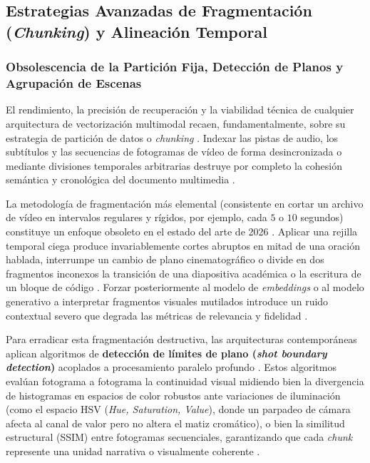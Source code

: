 
\subsection{Estrategias Avanzadas de Fragmentación (\textit{Chunking}) y Alineación Temporal}
\label{subsec:chunking_alineacion}

\subsubsection{Obsolescencia de la Partición Fija, Detección de Planos y Agrupación de Escenas}
\label{subsubsec:obsolescencia_particion_fija}

El rendimiento, la precisión de recuperación y la viabilidad técnica de cualquier arquitectura de vectorización multimodal recaen, fundamentalmente, sobre su estrategia de partición de datos o \textit{chunking} \cite{adaptive_chunking2026, multi_rag2025}. %
Indexar las pistas de audio, los subtítulos y las secuencias de fotogramas de vídeo de forma desincronizada o mediante divisiones temporales arbitrarias destruye por completo la cohesión semántica y cronológica del documento multimedia \cite{mixpeek_chunking}. %

La metodología de fragmentación más elemental (consistente en cortar un archivo de vídeo en intervalos regulares y rígidos, por ejemplo, cada $5$ o $10$ segundos) constituye un enfoque obsoleto en el estado del arte de 2026 \cite{video_rac2025, mixpeek_chunking}. %
Aplicar una rejilla temporal ciega produce invariablemente cortes abruptos en mitad de una oración hablada, interrumpe un cambio de plano cinematográfico o divide en dos fragmentos inconexos la transición de una diapositiva académica o la escritura de un bloque de código \cite{video_rac2025, mixpeek_chunking}. %
Forzar posteriormente al modelo de \textit{embeddings} o al modelo generativo a interpretar fragmentos visuales mutilados introduce un ruido contextual severo que degrada las métricas de relevancia y fidelidad \cite{video_rac2025}. %

Para erradicar esta fragmentación destructiva, las arquitecturas contemporáneas aplican algoritmos de \textbf{detección de límites de plano (\textit{shot boundary detection})} acoplados a procesamiento paralelo profundo \cite{mixpeek_chunking}. %
Estos algoritmos evalúan fotograma a fotograma la continuidad visual midiendo bien la divergencia de histogramas en espacios de color robustos ante variaciones de iluminación (como el espacio HSV (\textit{Hue, Saturation, Value}), donde un parpadeo de cámara afecta al canal de valor pero no altera el matiz cromático), o bien la similitud estructural (SSIM) entre fotogramas secuenciales, garantizando que cada \textit{chunk} represente una unidad narrativa o visualmente coherente \cite{mixpeek_chunking, video_rac2025}. %

